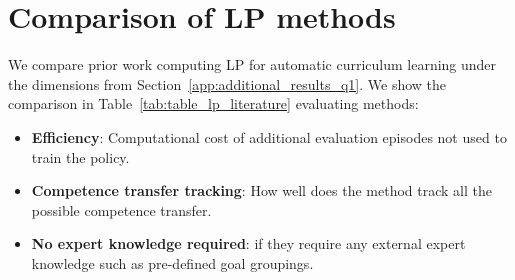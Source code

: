 \section{Comparison of LP methods} \label{app:lp_literature_review}
We compare prior work computing LP for automatic curriculum learning under the dimensions from Section~\ref{app:additional_results_q1}. We show the comparison in Table~\ref{tab:table_lp_literature} evaluating methods:
\begin{itemize}
    \item \textbf{Efficiency}: Computational cost of additional evaluation episodes not used to train the policy.
    \item \textbf{Competence transfer tracking}: How well does the method track all the possible competence transfer.
    \item \textbf{No expert knowledge required}: if they require any external expert knowledge such as pre-defined goal groupings.
\end{itemize}
